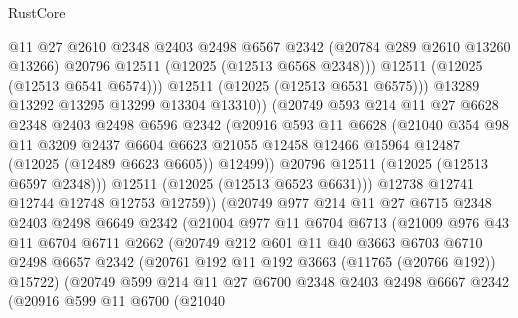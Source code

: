 \begin{lexlean}{RustCore}
\begin{coremodule}
                      @11
                      @27
                      @2610
                      @2348
                      @2403
                      @2498
                      @6567
                      @2342
                      (@20784 @289 @2610 @13260 @13266)
                      @20796
                      @12511
                      (@12025 (@12513 @6568 @2348)))
                    @12511
                    (@12025 (@12513 @6541 @6574)))
                  @12511
                  (@12025 (@12513 @6531 @6575)))
                @13289
                @13292
                @13295
                @13299
                @13304
                @13310))
            (@20749
              @593
              @214
              @11
              @27
              @6628
              @2348
              @2403
              @2498
              @6596
              @2342
              (@20916
                @593
                @11
                @6628
                (@21040
                  @354
                  @98
                  @11
                  @3209
                  @2437
                  @6604
                  @6623
                  @21055
                  @12458
                  @12466
                  @15964
                  @12487
                  (@12025 (@12489 @6623 @6605))
                  @12499))
              @20796
              @12511
              (@12025 (@12513 @6597 @2348)))
            @12511
            (@12025 (@12513 @6523 @6631)))
          @12738
          @12741
          @12744
          @12748
          @12753
          @12759))
      (@20749
        @977
        @214
        @11
        @27
        @6715
        @2348
        @2403
        @2498
        @6649
        @2342
        (@21004
          @977
          @11
          @6704
          @6713
          (@21009
            @976
            @43
            @11
            @6704
            @6711
            @2662
            (@20749
              @212
              @601
              @11
              @40
              @3663
              @6703
              @6710
              @2498
              @6657
              @2342
              (@20761 @192 @11 @192 @3663 (@11765 (@20766 @192)) @15722)
              (@20749
                @599
                @214
                @11
                @27
                @6700
                @2348
                @2403
                @2498
                @6667
                @2342
                (@20916
                  @599
                  @11
                  @6700
                  (@21040

\end{coremodule}
\end{lexlean}
